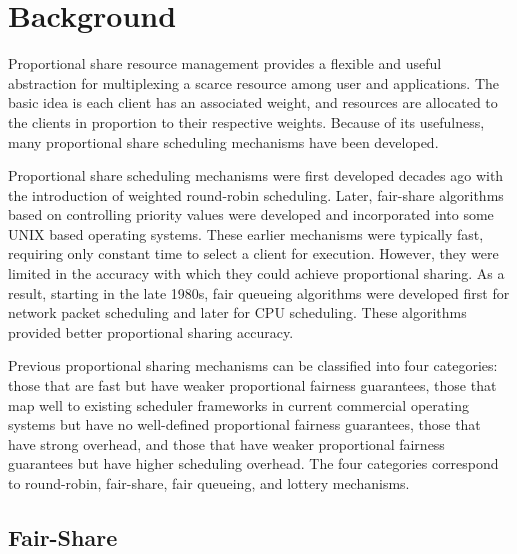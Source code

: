\chapter{Background}

Proportional share resource management provides a flexible and useful abstraction for multiplexing a scarce resource among user and applications. The basic idea is each client has an associated weight,
and resources are allocated to the clients in proportion to their respective weights. Because of its usefulness, 
many proportional share scheduling mechanisms have been developed.

Proportional share scheduling mechanisms were first developed decades ago with the introduction of
weighted round-robin scheduling. Later, fair-share algorithms based on controlling priority
values were developed and incorporated into some UNIX based operating systems.
These earlier mechanisms were typically fast, requiring only constant time to select a client for execution.
However, they were limited in the accuracy with which they could achieve proportional sharing.
As a result, starting in the late 1980s, fair queueing algorithms were developed first for
network packet scheduling and later for CPU scheduling. These algorithms provided better
proportional sharing accuracy.
                                               
Previous proportional sharing mechanisms can be
classified into four categories: those that are fast but
have weaker proportional fairness guarantees, those that
map well to existing scheduler frameworks in current
commercial operating systems but have no well-defined
proportional fairness guarantees, those that have strong
overhead, and those that have weaker proportional fairness guarantees but have higher scheduling overhead.
The four categories correspond to round-robin, fair-share, fair queueing, and lottery mechanisms.

\section{Fair-Share}

